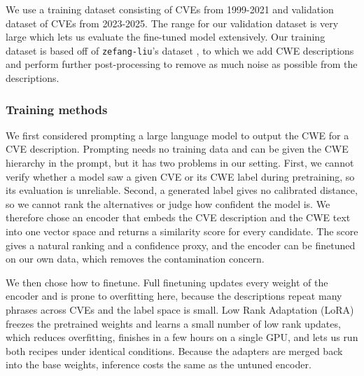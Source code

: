 \documentclass[conference,compsoc]{IEEEtran}
\begin{document}
We use a training dataset consisting of CVEs from 1999-2021 and validation dataset of  CVEs from 2023-2025. The range for our validation dataset is very large which lets us evaluate the fine-tuned model extensively. Our training dataset is based off of \texttt{zefang-liu}'s dataset \cite{liu2024cvecwedataset}, to which we add CWE descriptions and perform further post-processing to remove as much noise as possible from the descriptions. 


\subsubsection{Training methods}

We first considered prompting a large language model to output the CWE for a CVE description. Prompting needs no training data and can be given the CWE hierarchy in the prompt, but it has two problems in our setting. First, we cannot verify whether a model saw a given CVE or its CWE label during pretraining, so its evaluation is unreliable. Second, a generated label gives no calibrated distance, so we cannot rank the alternatives or judge how confident the model is. We therefore chose an encoder that embeds the CVE description and the CWE text into one vector space and returns a similarity score for every candidate. The score gives a natural ranking and a confidence proxy, and the encoder can be finetuned on our own data, which removes the contamination concern.

We then chose how to finetune. Full finetuning updates every weight of the encoder and is prone to overfitting here, because the descriptions repeat many phrases across CVEs and the label space is small. Low Rank Adaptation (LoRA) freezes the pretrained weights and learns a small number of low rank updates, which reduces overfitting, finishes in a few hours on a single GPU, and lets us run both recipes under identical conditions. Because the adapters are merged back into the base weights, inference costs the same as the untuned encoder.
\end{document}
